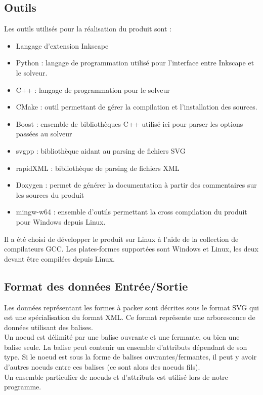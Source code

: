 \subsection{Outils}
Les outils utilisés pour la réalisation du produit sont :
\begin{itemize}
    \item Langage d'extension Inkscape
    \item Python : langage de programmation utilisé pour l'interface entre Inkscape et le solveur.
    \item C++ : langage de programmation pour le solveur
    \item CMake : outil permettant de gérer la compilation et l'installation des sources.
    \item Boost : ensemble de bibliothèques C++ utilisé ici pour parser les options passées au solveur
    \item svgpp : bibliothèque aidant au parsing de fichiers SVG
    \item rapidXML : bibliothèque de parsing de fichiers XML
    \item Doxygen : permet de générer la documentation à partir des commentaires sur les sources du produit
    \item mingw-w64 : ensemble d'outils permettant la cross compilation du produit pour Windows depuis Linux.
    
\end{itemize}

\vspace{1em}
Il a été choisi de développer le produit sur Linux à l'aide de la collection de compilateurs GCC. Les plates-formes supportées sont Windows et Linux, les deux devant être compilées depuis Linux.

\subsection{Format des données Entrée/Sortie}

\indent Les données représentant les formes à packer sont décrites sous le format SVG qui est une spécialisation du format XML. Ce format représente une arborescence de données utilisant des balises.\\

Un noeud est délimité par une balise ouvrante et une fermante, ou bien une balise seule. La balise peut contenir un ensemble d'attributs dépendant de son type. Si le noeud est sous la forme de balises ouvrantes/fermantes, il peut y avoir d'autres noeuds entre ces balises (ce sont alors des noeuds fils).\\
Un ensemble particulier de noeuds et d'attributs est utilisé lors de notre programme.

